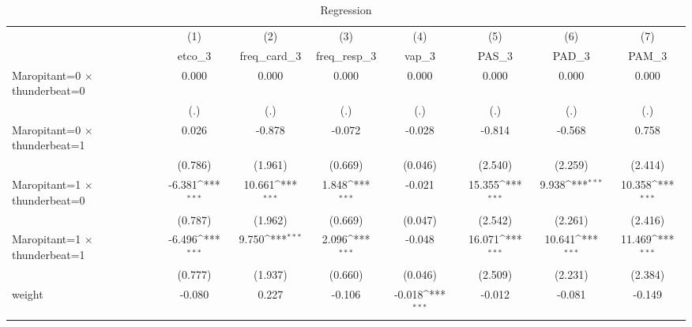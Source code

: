 \begin{table}[htbp]\centering
\def\sym#1{\ifmmode^{#1}\else\(^{#1}\)\fi}
\caption{Regression}
\begin{tabular}{l*{7}{c}}
\toprule
                    &\multicolumn{1}{c}{(1)}&\multicolumn{1}{c}{(2)}&\multicolumn{1}{c}{(3)}&\multicolumn{1}{c}{(4)}&\multicolumn{1}{c}{(5)}&\multicolumn{1}{c}{(6)}&\multicolumn{1}{c}{(7)}\\
                    &\multicolumn{1}{c}{etco\_3}&\multicolumn{1}{c}{freq\_card\_3}&\multicolumn{1}{c}{freq\_resp\_3}&\multicolumn{1}{c}{vap\_3}&\multicolumn{1}{c}{PAS\_3}&\multicolumn{1}{c}{PAD\_3}&\multicolumn{1}{c}{PAM\_3}\\
\midrule
Maropitant=0 $\times$ thunderbeat=0&       0.000         &       0.000         &       0.000         &       0.000         &       0.000         &       0.000         &       0.000         \\
                    &         (.)         &         (.)         &         (.)         &         (.)         &         (.)         &         (.)         &         (.)         \\
\addlinespace
Maropitant=0 $\times$ thunderbeat=1&       0.026         &      -0.878         &      -0.072         &      -0.028         &      -0.814         &      -0.568         &       0.758         \\
                    &     (0.786)         &     (1.961)         &     (0.669)         &     (0.046)         &     (2.540)         &     (2.259)         &     (2.414)         \\
\addlinespace
Maropitant=1 $\times$ thunderbeat=0&      -6.381\sym{***}&      10.661\sym{***}&       1.848\sym{***}&      -0.021         &      15.355\sym{***}&       9.938\sym{***}&      10.358\sym{***}\\
                    &     (0.787)         &     (1.962)         &     (0.669)         &     (0.047)         &     (2.542)         &     (2.261)         &     (2.416)         \\
\addlinespace
Maropitant=1 $\times$ thunderbeat=1&      -6.496\sym{***}&       9.750\sym{***}&       2.096\sym{***}&      -0.048         &      16.071\sym{***}&      10.641\sym{***}&      11.469\sym{***}\\
                    &     (0.777)         &     (1.937)         &     (0.660)         &     (0.046)         &     (2.509)         &     (2.231)         &     (2.384)         \\
\addlinespace
weight              &      -0.080         &       0.227         &      -0.106         &      -0.018\sym{***}&      -0.012         &      -0.081         &      -0.149         \\

\end{tabular}
\end{table}
